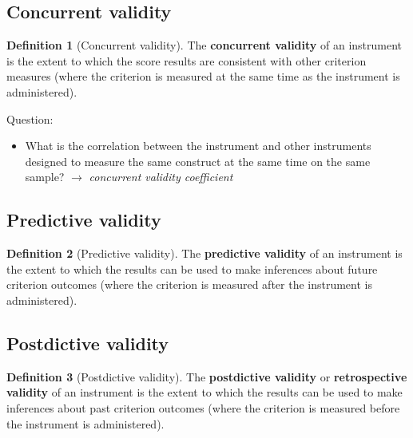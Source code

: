\documentclass[
  11pt,
]{book}
\providecommand{\tightlist}{%
  \setlength{\itemsep}{0pt}\setlength{\parskip}{0pt}}
\theoremstyle{definition}
\newtheorem{definition}{Definition}[chapter]
\theoremstyle{definition}
\theoremstyle{definition}
\theoremstyle{definition}
\theoremstyle{remark}
\begin{document}
\hypertarget{concurrent-validity}{%
\subsection{Concurrent validity}\label{concurrent-validity}}

\begin{definition}[Concurrent validity]
\protect\hypertarget{def:defconcurrentvalidity}{}\label{def:defconcurrentvalidity}The \textbf{concurrent validity} of an instrument is the extent to which the score results are consistent with other criterion measures (where the criterion is measured at the same time as the instrument is administered).
\end{definition}

Question:

\begin{itemize}
\tightlist
\item
  What is the correlation between the instrument and other instruments designed to measure the same construct at the same time on the same sample? \(\rightarrow\) \emph{concurrent validity coefficient}
\end{itemize}

\hypertarget{predictive-validity}{%
\subsection{Predictive validity}\label{predictive-validity}}

\begin{definition}[Predictive validity]
\protect\hypertarget{def:defpredictivevalidity}{}\label{def:defpredictivevalidity}The \textbf{predictive validity} of an instrument is the extent to which the results can be used to make inferences about future criterion outcomes (where the criterion is measured after the instrument is administered).
\end{definition}

\hypertarget{postdictive-validity}{%
\subsection{Postdictive validity}\label{postdictive-validity}}

\begin{definition}[Postdictive validity]
\protect\hypertarget{def:defpostdictivevalidity}{}\label{def:defpostdictivevalidity}The \textbf{postdictive validity} or \textbf{retrospective validity} of an instrument is the extent to which the results can be used to make inferences about past criterion outcomes (where the criterion is measured before the instrument is administered).
\end{definition}
\end{document}
